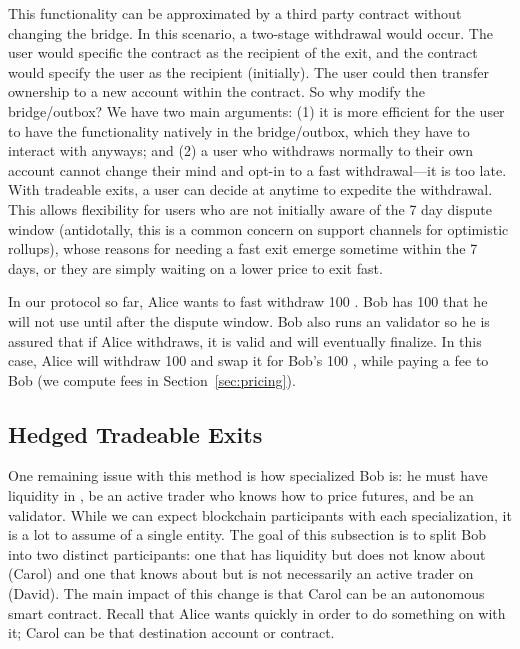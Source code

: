 This functionality can be approximated by a third party \layerone contract without changing the bridge. In this scenario, a two-stage withdrawal would occur. The user would specific the contract as the recipient of the exit, and the contract would specify the user as the recipient (initially). The user could then transfer ownership to a new account within the contract. So why modify the bridge/outbox? We have two main arguments: (1) it is more efficient for the user to have the functionality natively in the bridge/outbox, which they have to interact with anyways; and (2) a user who withdraws normally to their own account cannot change their mind and opt-in to a fast withdrawal---it is too late. With tradeable exits, a user can decide at anytime to expedite the withdrawal. This allows flexibility for users who are not initially aware of the 7 day dispute window (antidotally, this is a common concern on support channels for optimistic rollups), whose reasons for needing a fast exit emerge sometime within the 7 days, or they are simply waiting on a lower price to exit fast.

In our protocol so far, Alice wants to fast withdraw 100 \ethtwo. Bob has 100 \ethone that he will not use until after the dispute window. Bob also runs an \layertwo validator so he is assured that if Alice withdraws, it is valid and will eventually finalize. In this case, Alice will withdraw 100 \ethxx and swap it for Bob's 100 \ethone, while paying a fee to Bob (we compute fees in Section~\ref{sec:pricing}).  

\subsection{Hedged Tradeable Exits}
\label{sec:PM}

One remaining issue with this method is how specialized Bob is: he must have liquidity in \ethone, be an active trader who knows how to price futures, and be an \layertwo validator. While we can expect blockchain participants with each specialization, it is a lot to assume of a single entity. The goal of this subsection is to split Bob into two distinct participants: one that has \ethone liquidity but does not know about \layertwo (Carol) and one that knows about \layertwo but is not necessarily an active trader on \layerone (David). The main impact of this change is that Carol can be an autonomous \layerone smart contract. Recall that Alice wants \ethone quickly in order to do something on \layerone with it; Carol can be that destination account or contract.

